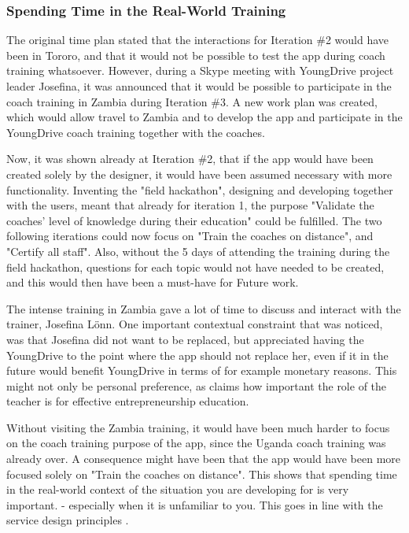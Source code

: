   \subsubsection{Spending Time in the Real-World Training}
  The original time plan stated that the interactions for Iteration \#2 would have been in Tororo, and that it would not be possible to test the app during coach training whatsoever. However, during a Skype meeting with YoungDrive project leader Josefina, it was announced that it would be possible to participate in the coach training in Zambia during Iteration \#3. A new work plan was created, which would allow travel to Zambia and to develop the app and participate in the YoungDrive coach training together with the coaches.


  Now, it was shown already at Iteration \#2, that if the app would have been created solely by the designer, it would have been assumed necessary with more functionality. Inventing the "field hackathon", designing and developing together with the users, meant that already for iteration 1, the purpose "Validate the coaches' level of knowledge during their education" could be fulfilled. The two following iterations could now focus on "Train the coaches on distance", and "Certify all staff". Also, without the 5 days of attending the training during the field hackathon, questions for each topic would not have needed to be created, and this would then have been a must-have for Future work. %

  The intense training in Zambia gave a lot of time to discuss and interact with the trainer, Josefina Lönn. One important contextual constraint that was noticed, was that Josefina did not want to be replaced, but appreciated having the YoungDrive to the point where the app should not replace her, even if it in the future would benefit YoungDrive in terms of for example monetary reasons. This might not only be personal preference, as \cite{ruskovaara} claims how important the role of the teacher is for effective entrepreneurship education.

  Without visiting the Zambia training, it would have been much harder to focus on the coach training purpose of the app, since the Uganda coach training was already over. A consequence might have been that the app would have been more focused solely on "Train the coaches on distance". This shows that spending time in the real-world context of the situation you are developing for is very important. - especially when it is unfamiliar to you. This goes in line with the service design principles \citep{stickdorn}.

